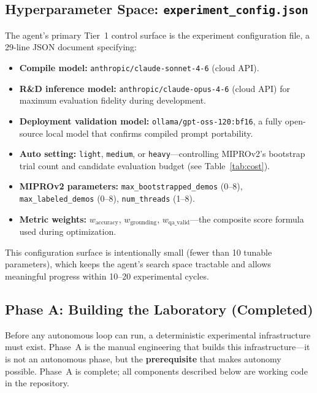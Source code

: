 \documentclass[11pt]{article}
\begin{document}
\subsection{Hyperparameter Space: \texttt{experiment\_config.json}}

The agent's primary Tier~1 control surface is the experiment configuration
file, a 29-line JSON document specifying:

\begin{itemize}[leftmargin=2em]
  \item \textbf{Compile model:} \texttt{anthropic/claude-sonnet-4-6}
  (cloud API).
  \item \textbf{R\&D inference model:} \texttt{anthropic/claude-opus-4-6}
  (cloud API) for maximum evaluation fidelity during development.
  \item \textbf{Deployment validation model:} \texttt{ollama/gpt-oss-120:bf16},
  a fully open-source local model that confirms compiled prompt portability.
  \item \textbf{Auto setting:} \texttt{light}, \texttt{medium}, or
  \texttt{heavy}---controlling MIPROv2's bootstrap trial count and
  candidate evaluation budget (see Table~\ref{tab:cost}).
  \item \textbf{MIPROv2 parameters:} \texttt{max\_bootstrapped\_demos} (0--8),
  \texttt{max\_labeled\_demos} (0--8), \texttt{num\_threads} (1--8).
  \item \textbf{Metric weights:} $w_{\text{accuracy}}$,
  $w_{\text{grounding}}$, $w_{\text{qa\_valid}}$---the composite score
  formula used during optimization.
\end{itemize}

This configuration surface is intentionally small (fewer than 10 tunable
parameters), which keeps the agent's search space tractable and allows
meaningful progress within 10--20 experimental cycles.

\subsection{Phase A: Building the Laboratory (Completed)}
\label{sec:phase_a}

Before any autonomous loop can run, a deterministic experimental
infrastructure must exist. Phase~A is the manual engineering that
builds this infrastructure---it is not an autonomous phase, but the
\textbf{prerequisite} that makes autonomy possible. Phase~A is complete;
all components described below are working code in the repository.
\end{document}
